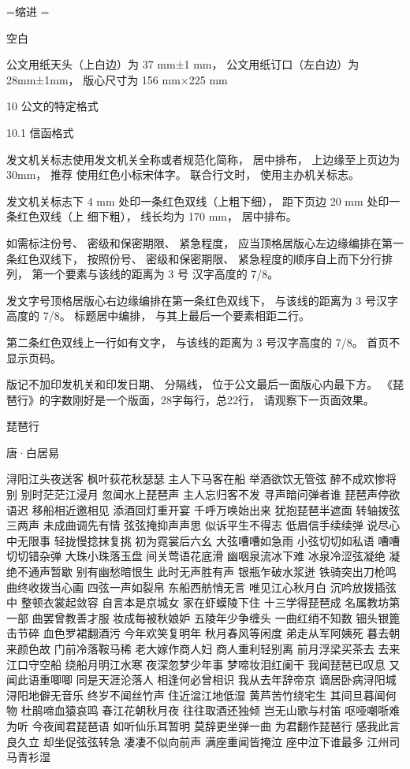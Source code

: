 \documentclass[a4paper,twoside]{article}
\begin{document}
\fontsize{15.85pt}{0pt}
=\hbox{缩进}
\parindent=
\baselineskip=29.71875pt
\begin{center}
  空白
\end{center}

公文用纸天头（上白边）为 37 mm±1 mm，
公文用纸订口（左白边）为 28mm±1mm，
版心尺寸为 156 mm×225 mm


10 公文的特定格式

10.1 信函格式

发文机关标志使用发文机关全称或者规范化简称， 居中排布， 上边缘至上页边为 30mm， 推荐
使用红色小标宋体字。 联合行文时， 使用主办机关标志。

发文机关标志下 4 mm 处印一条红色双线（上粗下细）， 距下页边 20 mm 处印一条红色双线（上
细下粗）， 线长均为 170 mm， 居中排布。

如需标注份号、 密级和保密期限、 紧急程度， 应当顶格居版心左边缘编排在第一条红色双线下，
按照份号、 密级和保密期限、 紧急程度的顺序自上而下分行排列， 第一个要素与该线的距离为 3 号
汉字高度的 7/8。

发文字号顶格居版心右边缘编排在第一条红色双线下， 与该线的距离为 3 号汉字高度的 7/8。
标题居中编排， 与其上最后一个要素相距二行。

第二条红色双线上一行如有文字， 与该线的距离为 3 号汉字高度的 7/8。
首页不显示页码。

版记不加印发机关和印发日期、 分隔线， 位于公文最后一面版心内最下方。
\vfill
《琵琶行》的字数刚好是一个版面，28字每行，总22行，
请观察下一页面效果。
\begin{center}
琵\quad 琶\quad 行

唐·白居易
\end{center}
\newpage
\noindent%
浔阳江头夜送客 枫叶荻花秋瑟瑟
主人下马客在船 举酒欲饮无管弦%
醉不成欢惨将别 别时茫茫江浸月
%
忽闻水上琵琶声 主人忘归客不发%
寻声暗问弹者谁 琵琶声停欲语迟
移船相近邀相见 添酒回灯重开宴%
千呼万唤始出来 犹抱琵琶半遮面
转轴拨弦三两声 未成曲调先有情%
弦弦掩抑声声思 似诉平生不得志
低眉信手续续弹 说尽心中无限事%
轻拢慢捻抹复挑 初为霓裳后六幺
大弦嘈嘈如急雨 小弦切切如私语%
嘈嘈切切错杂弹 大珠小珠落玉盘
间关莺语花底滑 幽咽泉流冰下难%
冰泉冷涩弦凝绝 凝绝不通声暂歇
别有幽愁暗恨生 此时无声胜有声%
银瓶乍破水浆迸 铁骑突出刀枪鸣
曲终收拨当心画 四弦一声如裂帛%
东船西舫悄无言 唯见江心秋月白
%
沉吟放拨插弦中 整顿衣裳起敛容%
自言本是京城女 家在虾蟆陵下住
十三学得琵琶成 名属教坊第一部%
曲罢曾教善才服 妆成每被秋娘妒
五陵年少争缠头 一曲红绡不知数%
钿头银篦击节碎 血色罗裙翻酒污
今年欢笑复明年 秋月春风等闲度%
弟走从军阿姨死 暮去朝来颜色故
门前冷落鞍马稀 老大嫁作商人妇%
商人重利轻别离 前月浮梁买茶去
去来江口守空船 绕船月明江水寒%
夜深忽梦少年事 梦啼妆泪红阑干
%
我闻琵琶已叹息 又闻此语重唧唧%
同是天涯沦落人 相逢何必曾相识
我从去年辞帝京 谪居卧病浔阳城%
浔阳地僻无音乐 终岁不闻丝竹声
住近湓江地低湿 黄芦苦竹绕宅生%
其间旦暮闻何物 杜鹃啼血猿哀鸣
春江花朝秋月夜 往往取酒还独倾%
岂无山歌与村笛 呕哑嘲哳难为听
今夜闻君琵琶语 如听仙乐耳暂明%
莫辞更坐弹一曲 为君翻作琵琶行
感我此言良久立 却坐促弦弦转急%
凄凄不似向前声 满座重闻皆掩泣
座中泣下谁最多 江州司马青衫湿%
\end{document}
